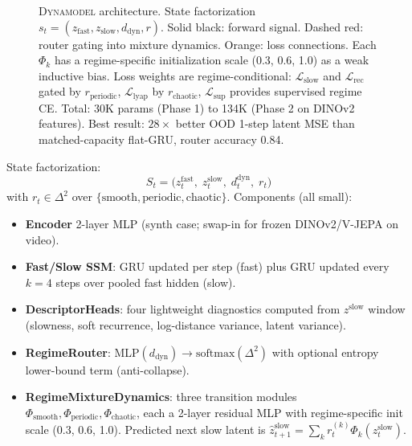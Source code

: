 \documentclass[11pt,a4paper]{article}
\begin{document}
\begin{figure}[ht]
\caption{\textsc{Dynamodel} architecture. State factorization
$s_t = (z_{\text{fast}}, z_{\text{slow}}, d_{\text{dyn}}, r)$.
Solid black: forward signal. Dashed red: router gating into mixture
dynamics. Orange: loss connections. Each $\Phi_k$ has a regime-specific
initialization scale (0.3, 0.6, 1.0) as a weak inductive bias. Loss
weights are regime-conditional: $\mathcal{L}_{\text{slow}}$ and
$\mathcal{L}_{\text{rec}}$ gated by $r_{\text{periodic}}$,
$\mathcal{L}_{\text{lyap}}$ by $r_{\text{chaotic}}$, $\mathcal{L}_{\text{sup}}$
provides supervised regime CE. Total: 30K params (Phase 1) to 134K
(Phase 2 on DINOv2 features). Best result: $28\times$ better OOD
1-step latent MSE than matched-capacity flat-GRU, router accuracy 0.84.}
\label{fig:dynamodel}
\end{figure}

State factorization:
$$
S_t = \big(z^{\text{fast}}_t,\; z^{\text{slow}}_t,\; d^{\text{dyn}}_t,\; r_t \big)
$$
with $r_t \in \Delta^2$ over $\{\text{smooth}, \text{periodic},
\text{chaotic}\}$. Components (all small):

\begin{itemize}
\item \textbf{Encoder} 2-layer MLP (synth case; swap-in for frozen DINOv2/V-JEPA on video).
\item \textbf{Fast/Slow SSM}: GRU updated per step (fast) plus GRU
  updated every $k=4$ steps over pooled fast hidden (slow).
\item \textbf{DescriptorHeads}: four lightweight diagnostics computed
  from $z^{\text{slow}}$ window (slowness, soft recurrence,
  log-distance variance, latent variance).
\item \textbf{RegimeRouter}: MLP$(d_\text{dyn}) \to \mathrm{softmax}(\Delta^2)$
  with optional entropy lower-bound term (anti-collapse).
\item \textbf{RegimeMixtureDynamics}: three transition modules
  $\Phi_\text{smooth}, \Phi_\text{periodic}, \Phi_\text{chaotic}$,
  each a 2-layer residual MLP with regime-specific init scale (0.3,
  0.6, 1.0). Predicted next slow latent is $\hat z^{\text{slow}}_{t+1}
  = \sum_k r_t^{(k)} \Phi_k(z^{\text{slow}}_t)$.
\end{itemize}
\end{document}
